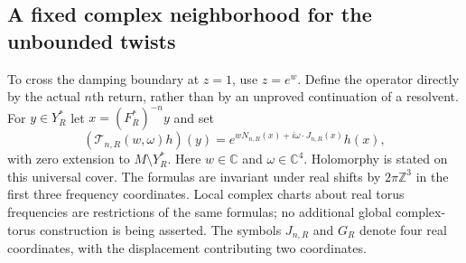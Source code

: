 \subsection{A fixed complex neighborhood for the unbounded twists}
To cross the damping boundary at $z=1$, use $z=e^w$. Define the operator
directly by the actual $n$th return, rather than by an unproved
continuation of a resolvent. For $y\in Y_R^*$ let $x=(F_R^*)^{-n}y$ and set
\begin{equation}\label{eq:block-scale-operator}
 (\mathcal T_{n,R}(w,\omega)h)(y)
       =e^{wN_{n,R}(x)+i\omega\cdot J_{n,R}(x)}h(x),
\end{equation}
with zero extension to $M\setminus Y_R^*$. Here $w\in\mathbb C$ and
$\omega\in\mathbb C^4$. Holomorphy is stated on this universal cover.
The formulas are invariant under real shifts by $2\pi\mathbb Z^3$
in the first three frequency coordinates. Local complex charts about
real torus frequencies are restrictions of the same formulas; no
additional global complex-torus construction is being asserted. The
symbols $J_{n,R}$ and $G_R$ denote four real coordinates, with the
displacement contributing two coordinates.

